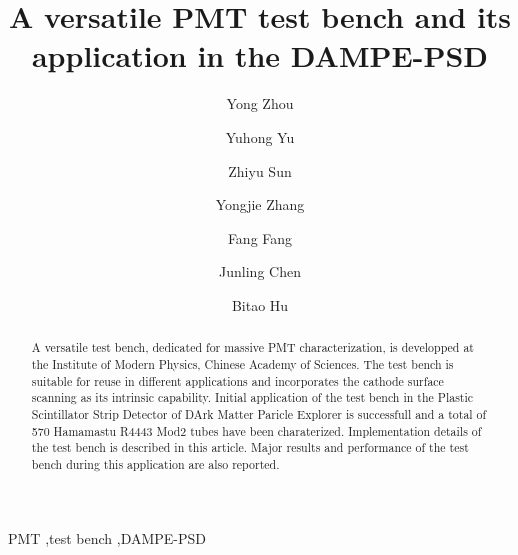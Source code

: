 \documentclass[5p, times]{elsarticle}
\begin{document}
\begin{frontmatter}

\title{A versatile PMT test bench and its application in the DAMPE-PSD}

\author[imp,lzu,ucas]{Yong Zhou}

\author[imp]{Yuhong Yu}

\author[imp]{Zhiyu Sun}

\author[imp]{Yongjie Zhang}
\author[imp]{Fang Fang}
\author[imp]{Junling Chen}

\author[lzu]{Bitao Hu}

\address[imp]{Institute of Modern Physicas, Chinese Academy of Sciences,  509 Nanchang Road,  Lanzhou,  730000,  P.R.China}
\address[lzu]{School of Nuclear Science and Technology,  Lanzhou University,  222 South Tianshui Road,  Lanzhou,  730000,  P.R.China}
\address[ucas]{Graduate University of the Chinese Academy of Sciences,  19A Yuquan Road,  Beijing,  100049,  P.R.China}

\begin{abstract}

A versatile test bench, dedicated for massive PMT characterization, is developped at the Institute of Modern Physics, Chinese Academy of Sciences.
The test bench is suitable for reuse in different applications and incorporates the cathode surface scanning as its intrinsic capability.
Initial application of the test bench in the Plastic Scintillator Strip Detector of DArk Matter Paricle Explorer is successfull and a total of 570 Hamamastu R4443 Mod2 tubes have been charaterized.
Implementation details of the test bench is described in this article.
Major results and performance of the test bench during this application are also reported. 
\end{abstract}

\begin{keyword}
PMT
\sep test bench
\sep DAMPE-PSD



\end{keyword}

\end{frontmatter}
\end{document}

